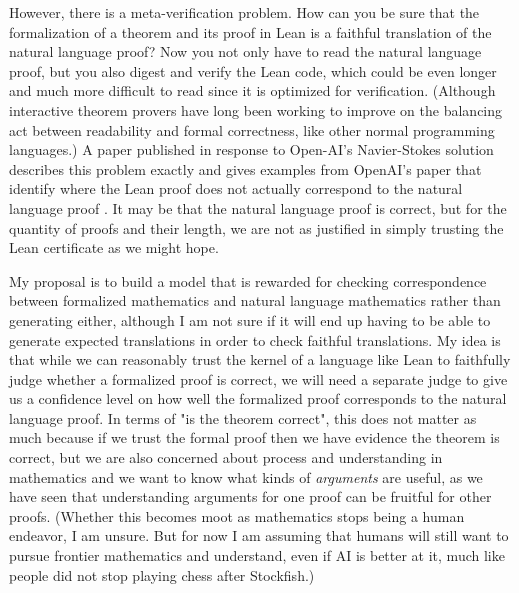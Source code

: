 \documentclass[12pt]{article}
\begin{document}
However, there is a meta-verification problem. How can you be sure that the formalization of a theorem and its proof in Lean is a faithful translation of the natural language proof? Now you not only have to read the natural language proof, but you also digest and verify the Lean code, which could be even longer and much more difficult to read since it is optimized for verification. (Although interactive theorem provers have long been working to improve on the balancing act between readability and formal correctness, like other normal programming languages.) A paper published in response to Open-AI's Navier-Stokes solution describes this problem exactly and gives examples from OpenAI's paper that identify where the Lean proof does not actually correspond to the natural language proof \citep{bastounis2026}. It may be that the natural language proof is correct, but for the quantity of proofs and their length, we are not as justified in simply trusting the Lean certificate as we might hope. 

My proposal is to build a model that is rewarded for checking correspondence between formalized mathematics and natural language mathematics rather than generating either, although I am not sure if it will end up having to be able to generate expected translations in order to check faithful translations. My idea is that while we can reasonably trust the kernel of a language like Lean to faithfully judge whether a formalized proof is correct, we will need a separate judge to give us a confidence level on how well the formalized proof corresponds to the natural language proof. In terms of "is the theorem correct", this does not matter as much because if we trust the formal proof then we have evidence the theorem is correct, but we are also concerned about process and understanding in mathematics and we want to know what kinds of \emph{arguments} are useful, as we have seen that understanding arguments for one proof can be fruitful for other proofs. (Whether this becomes moot as mathematics stops being a human endeavor, I am unsure. But for now I am assuming that humans will still want to pursue frontier mathematics and understand, even if AI is better at it, much like people did not stop playing chess after Stockfish.)
\end{document}
